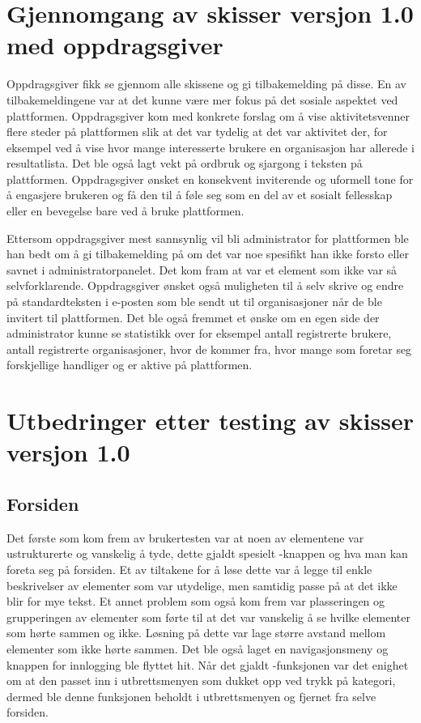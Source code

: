 \section{Gjennomgang av skisser versjon 1.0 med oppdragsgiver}
\label{section:skisser1.0-oppdragsgiver}

Oppdragsgiver fikk se gjennom alle skissene og gi tilbakemelding på disse. En av tilbakemeldingene var at det kunne være mer fokus på det sosiale aspektet ved plattformen. Oppdragsgiver kom med konkrete forslag om å vise aktivitetsvenner flere steder på plattformen slik at det var tydelig at det var aktivitet der, for eksempel ved å vise hvor mange interesserte brukere en organisasjon har allerede i resultatlista. Det ble også lagt vekt på ordbruk og sjargong i teksten på plattformen. Oppdragsgiver ønsket en konsekvent inviterende og uformell tone for å engasjere brukeren og få den til å føle seg som en del av et sosialt fellesskap eller en bevegelse bare ved å bruke plattformen.

Ettersom oppdragsgiver mest sannsynlig vil bli administrator for plattformen ble han bedt om å gi tilbakemelding på om det var noe spesifikt han ikke forsto eller savnet i administratorpanelet. Det kom fram at  var et element som ikke var så selvforklarende. Oppdragsgiver ønsket også muligheten til å selv skrive og endre på standardteksten i e-posten som ble sendt ut til organisasjoner når de ble invitert til plattformen. Det ble også fremmet et ønske om en egen side der administrator kunne se statistikk over for eksempel antall registrerte brukere, antall registrerte organisasjoner, hvor de kommer fra, hvor mange som foretar seg forskjellige handliger og er aktive på plattformen.


\section{Utbedringer etter testing av skisser versjon 1.0}
\label{section:utbedringer-skisser-1}
\subsection{Forsiden}

Det første som kom frem av brukertesten var at noen av elementene var ustrukturerte og vanskelig å tyde, dette gjaldt spesielt -knappen og hva man kan foreta seg på forsiden. Et av tiltakene for å løse dette var å legge til enkle beskrivelser av elementer som var utydelige, men samtidig passe på at det ikke blir for mye tekst. Et annet problem som også kom frem var plasseringen og grupperingen av elementer som førte til at det var vanskelig å se hvilke elementer som hørte sammen og ikke. Løsning på dette var lage større avstand mellom elementer som ikke hørte sammen. Det ble også laget en navigasjonsmeny og knappen for innlogging ble flyttet hit. Når det gjaldt -funksjonen var det enighet om at den passet inn i utbrettsmenyen som dukket opp ved trykk på kategori, dermed ble denne funksjonen beholdt i utbrettsmenyen og fjernet fra selve forsiden.

